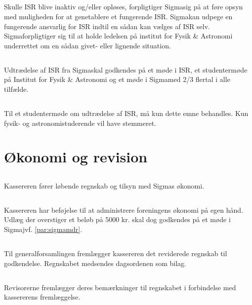 \documentclass[danish,a4paper,twocolumn]{article}
\newcommand{\foreningen}{Sigma}
\begin{document}
\subsection{}Skulle ISR blive inaktiv og/eller opløses, forpligtiger \foreningen sig på at føre opsyn med muligheden for at genetablere et fungerende ISR. \foreningen kan udpege en fungerende ansvarlig for ISR indtil en sådan kan vælges af ISR selv. \foreningen forpligtiger sig til at holde ledelsen på institut for Fysik \& Astronomi underrettet om en sådan givet- eller lignende situation.
\subsection{}Udtrædelse af ISR fra \foreningen skal godkendes på et møde i ISR, et studentermøde på Institut for  Fysik \& Astronomi og et møde i \foreningen med 2/3 flertal i alle tilfælde.
\subsection{}Til et studentermøde om udtrædelse af ISR, må kun dette emne behandles. Kun fysik- og astronomistuderende vil have stemmeret.

\section{Økonomi og revision}
\subsection{}Kassereren fører løbende regnskab og tilsyn med \foreningen s økonomi.
\subsection{}Kassereren har beføjelse til at administrere foreningens økonomi på egen hånd. Udlæg der overstiger et beløb på 5000 kr. skal dog godkendes på et møde i \foreningen jvf. \ref{par:sigmamdr}.

\subsection{}Til generalforsamlingen fremlægger kassereren det reviderede regnskab til godkendelse. Regnskabet medsendes dagsordenen som bilag.
\subsection{}Revisorerne fremlægger deres bemærkninger til regnskabet i forbindelse med kassererens fremlæggelse.
\end{document}
